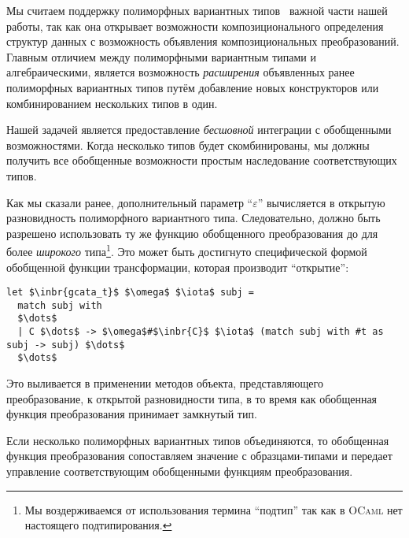 Мы считаем поддержку полиморфных вариантных типов~\cite{PolyVar,PolyVarReuse} важной части нашей работы, так как она открывает возможности 
композиционального определения структур данных с возможность объявления композициональных преобразований.
Главным отличием между полиморфными вариантным типами  и алгебраическими, является возможность 
\emph{расширения} объявленных ранее полиморфных вариантных типов путём добавление новых конструкторов или комбинированием нескольких типов в один. 

Нашей задачей является предоставление  \emph{бесшовной} интеграции с обобщенными возможностями. Когда несколько типов будет скомбинированы, мы должны получить все обобщенные возможности простым наследование соответствующих типов.

Как мы сказали ранее, дополнительный параметр  ``$\varepsilon$'' вычисляется в открытую разновидность полиморфного вариантного типа. Следовательно, должно быть разрешено использовать ту же функцию обобщенного преобразования до для более \emph{широкого} типа\footnote{Мы воздерживаемся от использования термина ``подтип'' так как в \textsc{OCaml} нет настоящего подтипирования.}. 
Это может быть достигнуто специфической формой обобщенной функции трансформации, которая производит ``открытие'':

\begin{lstlisting}
let $\inbr{gcata_t}$ $\omega$ $\iota$ subj =
  match subj with
  $\dots$
  | C $\dots$ -> $\omega$#$\inbr{C}$ $\iota$ (match subj with #t as subj -> subj) $\dots$
  $\dots$
\end{lstlisting}

Это выливается в применении методов объекта, представляющего преобразование, к открытой разновидности типа, в то время как обобщенная функция преобразования принимает замкнутый тип.

Если несколько полиморфных вариантных типов объединяются, то обобщенная функция преобразования сопоставляем значение с образцами-типами и передает управление соответствующим обобщенными функциям преобразования.
